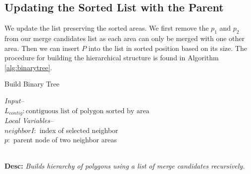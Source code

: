 \subsection{Updating the Sorted List with the Parent}
We update the list preserving the sorted areas. We first remove the $p_1$ and $p_2$ from our merge candidates list as each area can only be merged with one other area. Then we can insert $P$ into the list in sorted position based on its size. The procedure for building the hierarchical structure is found in Algorithm \ref{alg:binarytree}.

\begin{algorithm}
\footnotesize
\caption{Build Binary Tree}
\textit{Input--}\\
$L_{contig}: \text{contiguous list of polygon sorted by area}$\\
\textit{Local Variables--}\\
$neighborI:$ index of selected neighbor\\
$p:$ parent node of two neighbor areas
\begin{algorithmic}[1]
\IfEnd
{}
\EndProcedure
\end{algorithmic} \label{alg:binarytree}

~\\
\textbf{Desc: }\emph{Builds hierarchy of polygons using a list of merge candidates recursively. }
\end{algorithm} 


